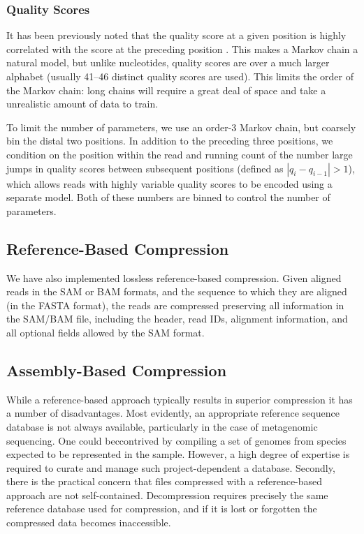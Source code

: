 \documentclass[twocolumn]{article}
\begin{document}
\subsubsection{Quality Scores}

It has been previously noted that the quality score at a given position is
highly correlated with the score at the preceding position
\citep{Kozanitis2011}. This makes a Markov chain a natural model, but unlike
nucleotides, quality scores are over a much larger alphabet (usually 41--46
distinct quality scores are used). This limits the order of the Markov chain:
long chains will require a great deal of space and take a unrealistic amount
of data to train.

To limit the number of parameters, we use an order-3 Markov chain, but
coarsely bin the distal two positions. In addition to the preceding three
positions, we condition on the position within the read and running count of
the number large jumps in quality scores between subsequent positions (defined
as $|q_{i} - q_{i-1}| > 1$), which allows reads with highly variable quality
scores to be encoded using a separate model. Both of these numbers are binned
to control the number of parameters.


\subsection{Reference-Based Compression}

We have also implemented lossless reference-based compression. Given aligned
reads in the SAM or BAM formats, and the sequence to which they are aligned
(in the FASTA format), the reads are compressed preserving all information in
the SAM/BAM file, including the header, read IDs, alignment information, and
all optional fields allowed by the SAM format.


\subsection{Assembly-Based Compression}

While a reference-based approach typically results in superior compression it
has a number of disadvantages. Most evidently, an appropriate reference
sequence database is not always available, particularly in the case of metagenomic
sequencing. One could beccontrived by compiling a set of genomes from species
expected to be represented in the sample. However, a high degree of expertise
is required to curate and manage such project-dependent a database. Secondly,
there is the practical concern that files compressed with a reference-based
approach are not self-contained. Decompression requires precisely the same
reference database used for compression, and if it is lost or forgotten the
compressed data becomes inaccessible.
\end{document}
